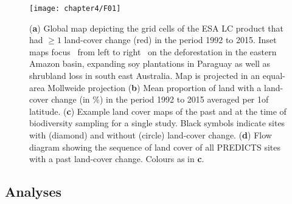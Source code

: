 \begin{figure}[htb]
\centering
\texttt{[image: chapter4/F01]}
\caption{ (\textbf{a}) Global map depicting the grid cells of the ESA LC product that had $\geq 1$ land-cover change (red) in the period 1992 to 2015. Inset maps focus \textendash\ from left to right \textendash\ on the deforestation in the eastern Amazon basin, expanding soy plantations in Paraguay as well as shrubland loss in south east Australia. Map is projected in an equal-area Mollweide projection (\textbf{b}) Mean proportion of land with a land-cover change (in \%) in the period 1992 to 2015 averaged per 1\textdegree of latitude. (\textbf{c}) Example land cover maps of the past and at the time of biodiversity sampling for a single study. Black symbols indicate sites with (diamond) and without (circle) land-cover change. (\textbf{d}) Flow diagram showing the sequence of land cover of all PREDICTS sites with a past land-cover change. Colours as in \textbf{c}.  }
\label{F04_01}
\end{figure}

\subsection{Analyses}
\label{C04_03}

